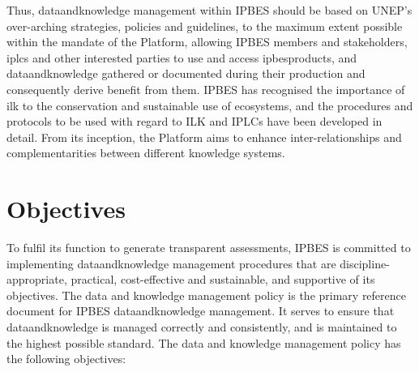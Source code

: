 \documentclass{article}
\begin{document}
Thus, \gls{dataandknowledge} management within IPBES should be based on UNEP’s over-arching strategies, policies and guidelines, to the maximum extent possible within the mandate of the Platform, allowing IPBES members and \glspl{stakeholder}, \glspl{iplc} and other interested parties to use and access \glspl{ipbesproduct}, and \gls{dataandknowledge} gathered or documented during their production and consequently derive benefit from them. IPBES has recognised the importance of \gls{ilk} to the conservation and sustainable use of ecosystems, and the procedures and protocols to be used with regard to ILK and IPLCs have been developed in detail. From its inception, the Platform aims to enhance inter-relationships and complementarities between different knowledge systems.

\section{Objectives}

To fulfil its function to generate transparent assessments, IPBES is committed to implementing \gls{dataandknowledge} management procedures that are discipline-appropriate, practical, cost-effective and sustainable, and supportive of its objectives. The data and knowledge management policy is the primary reference document for IPBES \gls{dataandknowledge} management. It serves to ensure that \gls{dataandknowledge} is managed correctly and consistently, and is maintained to the highest possible standard. The data and knowledge management policy has the following objectives:
\end{document}

